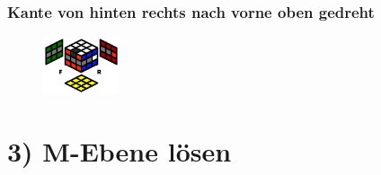 \documentclass[letterpaper,10pt,twoside,twocolumn,openany]{book}
\begin{document}
\subsubsection{Kante von hinten rechts nach \newline vorne oben gedreht}
\begin{figure}[!htb] 
  \centering
     \includegraphics[width=0.20\textwidth]{img/stopf_hard.png}
\end{figure}

\section{3) M-Ebene lösen}
\end{document}
